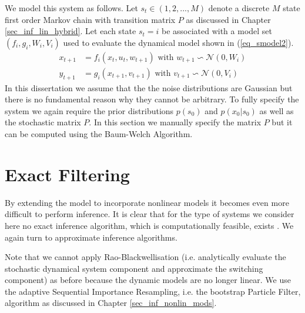We model this system as follows. Let $s_t \in (1,2,..., M)$ denote a discrete $M$ state first order Markov chain with transition matrix $P$ as discussed in Chapter \ref{sec_inf_lin_hybrid}. Let each state $s_t=i$ be associated with a model set $\left(f_i, g_i, W_i, V_i \right)$ used to evaluate the dynamical model shown in (\ref{eq_smodel2}).
\begin{equation}
\begin{aligned}
x_{t+1} &= f_i(x_t, u_t, w_{t+1}) \text{ with } w_{t+1} \backsim \mathcal{N}(0, W_i)\\
y_{t+1} &= g_i(x_{t+1}, v_{t+1}) \text{ with } v_{t+1} \backsim \mathcal{N}(0,V_i)
\end{aligned}
\label{eq_smodel2}
\end{equation}
In this dissertation we assume that the the noise distributions are Gaussian but there is no fundamental reason why they cannot be arbitrary. To fully specify the system we again require the prior distributions $p(s_0)$ and $p(x_0|s_0)$ as well as the stochastic matrix $P$. In this section we manually specify the matrix $P$ but it can be computed using the Baum-Welch Algorithm. 
\section{Exact Filtering}
By extending the model to incorporate nonlinear models it becomes even more difficult to perform inference. It is clear that for the type of systems we consider here no exact inference algorithm, which is computationally feasible, exists \cite{murphy1}. We again turn to approximate inference algorithms.

Note that we cannot apply Rao-Blackwellisation (i.e. analytically evaluate the stochastic dynamical system component and approximate the switching component) as before because the dynamic models are no longer linear. We use the adaptive Sequential Importance Resampling, i.e. the bootstrap Particle Filter, algorithm as discussed in Chapter \ref{sec_inf_nonlin_mods}.
